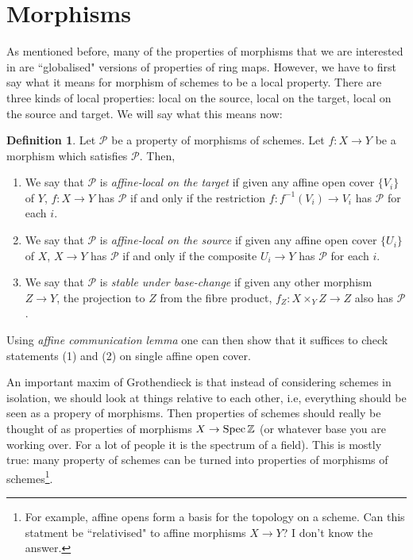 \documentclass[11pt]{amsart}
\newcommand{\Spec}{{\rm Spec \,}}
\newcommand{\Z}{{\mathbb Z}}
\theoremstyle{definition}
\newtheorem{definition}[theorem]{Definition}
\begin{document}
\section{Morphisms}
As mentioned before, many of the properties of morphisms that we are interested in are ``globalised" versions of properties of ring maps. However, we have to first say what it means for morphism of schemes to be a local property. There are three kinds of local properties: local on the source, local on the target, local on the source and target. We will say what this means now:

\begin{definition}\label{locally-P-morphisms}
	Let $\mathcal{P}$ be a property of morphisms of schemes. Let $f:X\rightarrow Y$ be a morphism which satisfies $\mathcal{P}$. Then,
	\begin{enumerate}
		\item We say that $\mathcal{P}$ is \textit{affine-local on the target} if given any affine open cover $\lbrace V_i\rbrace$ of $Y$, $f:X\rightarrow Y$ has $\mathcal{P}$ if and only if the restriction $f: f^{-1}(V_i)\rightarrow V_i$ has $\mathcal{P}$ for each $i$.
		\item We say that $\mathcal{P}$ is \textit{affine-local on the source} if given any affine open cover $\lbrace U_i\rbrace$ of $X$, $X\rightarrow Y$ has $\mathcal{P}$ if and only if the composite $U_i\rightarrow Y$ has $\mathcal{P}$ for each $i$.
		\item We say that $\mathcal{P}$ is \textit{stable under base-change} if given any other morphism $Z\rightarrow Y$, the projection to $Z$ from the fibre product, $f_Z: X\times_Y Z\rightarrow Z$ also has $\mathcal{P}$.
	\end{enumerate}
\end{definition}

Using \textit{affine communication lemma} one can then show that it suffices to check statements (1) and (2) on single affine open cover.


An important maxim of Grothendieck is that instead of considering schemes in isolation, we should look at things relative to each other, i.e, everything should be seen as a propery of morphisms. Then properties of schemes should really be thought of as properties of morphisms $X\rightarrow\Spec \Z$ (or whatever base you are working over. For a lot of people it is the spectrum of a field). This is mostly true: many property of schemes can be turned into properties of morphisms of schemes\footnote{For example, affine opens form a basis for the topology on a scheme. Can this statment be ``relativised" to affine morphisms $X\rightarrow Y$? I don't know the answer.}.
\end{document}
